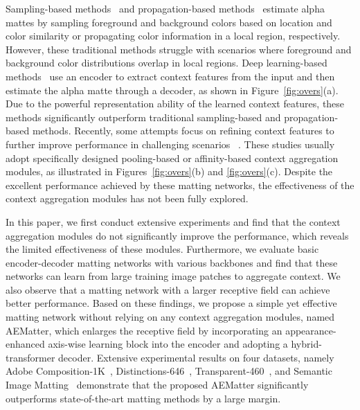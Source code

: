 \documentclass[10pt,twocolumn,letterpaper]{article}
\begin{document}
Sampling-based methods~\cite{berman1998method,ruzon2000alpha,chuang2001a,wang2007optimized,gastal2010shared} and propagation-based methods~\cite{grady2005random,levin2008a,levin2008spectral,he2010fast,chen2013knn} estimate alpha mattes by sampling foreground and background colors based on location and color similarity or propagating color information in a local region, respectively. 
However, these traditional methods struggle with scenarios where foreground and background color distributions overlap in local regions.
Deep learning-based methods~\cite{xu2017deep,lu2019indices} use an encoder to extract context features from the input and then 
estimate the alpha matte through a decoder, as shown in Figure~\ref{fig:overs}(a). 
Due to the powerful representation ability of the learned context features,  these methods significantly outperform traditional sampling-based and propagation-based methods.
Recently, some attempts focus on refining context features to further improve performance in challenging scenarios ~\cite{cai2019disentangled,li2020natural,forte2020fbamatting,yu2020high,liu2021lfpnet,park2022matteformer}.
These studies usually adopt specifically designed pooling-based or affinity-based context aggregation modules, as illustrated in Figures~\ref{fig:overs}(b) and \ref{fig:overs}(c).
Despite the excellent performance achieved by these matting networks, the effectiveness of the context aggregation modules has not been fully explored. 



In this paper, we first conduct extensive experiments and find that the context aggregation modules do not significantly improve the performance,  which reveals the limited effectiveness of these modules.
Furthermore, we evaluate basic encoder-decoder matting networks with various backbones and find that these networks can learn from large training image patches to aggregate context.
We also observe that a matting network with a larger receptive field can achieve better performance.
Based on these findings, we propose a simple yet effective matting network without relying on any context aggregation modules, named AEMatter,  which enlarges the receptive field by incorporating an appearance-enhanced axis-wise learning block into the encoder and adopting a hybrid-transformer decoder. 
Extensive experimental results on four datasets, namely Adobe Composition-1K~\cite{xu2017deep}, Distinctions-646~\cite{2020Attention},  Transparent-460~\cite{cai2022TransMatting}, and Semantic Image Matting~\cite{sun2021sim} demonstrate that the proposed AEMatter significantly outperforms state-of-the-art matting methods by a large margin. 
\end{document}

